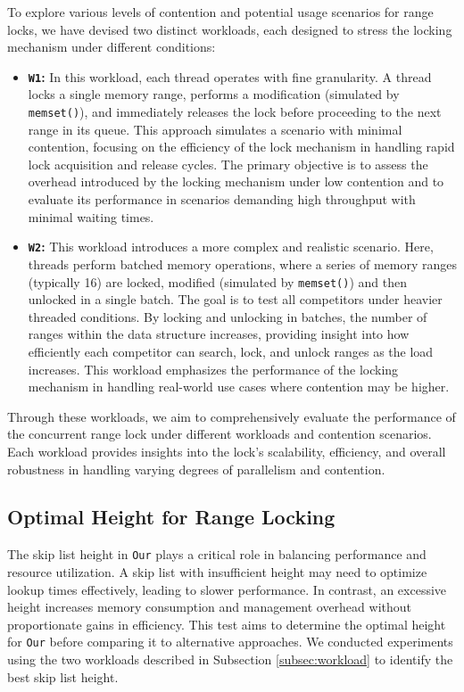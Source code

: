 To explore various levels of contention and potential usage scenarios for range locks, we have devised two distinct workloads, each designed to stress the locking mechanism under different conditions:

\begin{itemize} 
    \item \textbf{\texttt{W1}:} In this workload, each thread operates with fine granularity. 
    A thread locks a single memory range, performs a modification (simulated by \texttt{memset()}), and immediately releases the lock before proceeding to the next range in its queue. 
    This approach simulates a scenario with minimal contention, focusing on the efficiency of the lock mechanism in handling rapid lock acquisition and release cycles. 
    The primary objective is to assess the overhead introduced by the locking mechanism under low contention and to evaluate its performance in scenarios demanding high throughput with minimal waiting times.
    
    \item \textbf{\texttt{W2}:} This workload introduces a more complex and realistic scenario. 
    Here, threads perform batched memory operations, where a series of memory ranges (typically 16) are locked, modified (simulated by \texttt{memset()}) and then unlocked in a single batch. 
    The goal is to test all competitors under heavier threaded conditions. 
    By locking and unlocking in batches, the number of ranges within the data structure increases, providing insight into how efficiently each competitor can search, lock, and unlock ranges as the load increases. 
    This workload emphasizes the performance of the locking mechanism in handling real-world use cases where contention may be higher.
\end{itemize}

Through these workloads, we aim to comprehensively evaluate the performance of the concurrent range lock under different workloads and contention scenarios. 
Each workload provides insights into the lock's scalability, efficiency, and overall robustness in handling varying degrees of parallelism and contention.

\subsection{Optimal Height for Range Locking}

The skip list height in \texttt{Our} plays a critical role in balancing performance and resource utilization. 
A skip list with insufficient height may need to optimize lookup times effectively, leading to slower performance. 
In contrast, an excessive height increases memory consumption and management overhead without proportionate gains in efficiency. 
This test aims to determine the optimal height for \texttt{Our} before comparing it to alternative approaches. 
We conducted experiments using the two workloads described in Subsection \ref{subsec:workload} to identify the best skip list height.

